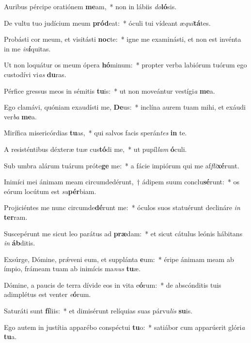 \item Auribus pércipe oratiónem \textbf{me}am,~* non in lábiis \textit{do}\textbf{ló}sis.
\item De vultu tuo judícium meum \textbf{pród}eat:~* óculi tui vídeant æ\textit{qui}\textbf{tá}tes.
\item Probásti cor meum, et visitásti \textbf{noc}te:~* igne me examinásti, et non est invénta in me \textit{in}\textbf{í}quitas.
\item Ut non loquátur os meum ópera \textbf{hó}minum:~* propter verba labiórum tuórum ego custodívi vi\textit{as} \textbf{du}ras.
\item Pérfice gressus meos in sémitis \textbf{tu}is:~* ut non moveántur vestígi\textit{a} \textbf{me}a.
\item Ego clamávi, quóniam exaudísti me, \textbf{De}us:~* inclína aurem tuam mihi, et exáudi ver\textit{ba} \textbf{me}a.
\item Mirífica misericórdias \textbf{tu}as,~* qui salvos facis sperán\textit{tes} \textbf{in} te.
\item A resisténtibus déxteræ tuæ cus\textbf{tó}di me,~* ut pupíl\textit{lam} \textbf{ó}culi.
\item Sub umbra alárum tuárum próte\textbf{ge} me:~* a fácie impiórum qui me af\textit{fli}\textbf{xé}runt.
\item Inimíci mei ánimam meam circumdedérunt,~† ádipem suum conclu\textbf{sé}runt:~* os eórum locútum est \textit{su}\textbf{pér}biam.
\item Projiciéntes me nunc circumde\textbf{dé}runt me:~* óculos suos statuérunt declináre \textit{in} \textbf{ter}ram.
\item Suscepérunt me sicut leo parátus ad \textbf{præ}dam:~* et sicut cátulus leónis hábitans \textit{in} \textbf{áb}ditis.
\item Exsúrge, Dómine, prǽveni eum, et supplánta \textbf{e}um:~* éripe ánimam meam ab ímpio, frámeam tuam ab inimícis ma\textit{nus} \textbf{tu}æ.
\item Dómine, a paucis de terra dívide eos in vita e\textbf{ó}rum:~* de abscónditis tuis adimplétus est venter \textit{e}\textbf{ó}rum.
\item Saturáti sunt \textbf{fí}liis:~* et dimisérunt relíquias suas párvu\textit{lis} \textbf{su}is.
\item Ego autem in justítia apparébo conspéctui \textbf{tu}o:~* satiábor cum apparúerit glóri\textit{a} \textbf{tu}a.
